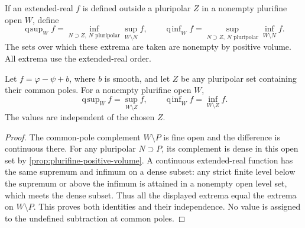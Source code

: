 \begin{definition}\label{def:pluripolar-quasi-extrema}
If an extended-real $f$ is defined outside a pluripolar $Z$ in a nonempty plurifine open $W$, define
\[
 \operatorname{q\!\sup}_W f
   =\inf_{N\supset Z,\ N\text{ pluripolar}}\sup_{W\setminus N}f,
 \qquad
 \operatorname{q\!\inf}_W f
   =\sup_{N\supset Z,\ N\text{ pluripolar}}\inf_{W\setminus N}f.
\]
The sets over which these extrema are taken are nonempty by positive volume. All extrema use the extended-real order.
\end{definition}

\begin{corollary}\label{cor:quasi-extrema-common-poles}
Let $f=\varphi-\psi+b$, where $b$ is smooth, and let $Z$ be any pluripolar set containing their common poles. For a nonempty plurifine open $W$,
\[
 \operatorname{q\!\sup}_W f=\sup_{W\setminus Z}f,
 \qquad
 \operatorname{q\!\inf}_W f=\inf_{W\setminus Z}f.
\]
The values are independent of the chosen $Z$.
\end{corollary}
\begin{proof}
The common-pole complement $W\setminus P$ is fine open and the difference is continuous there. For any pluripolar $N\supset P$, its complement is dense in this open set by \cref{prop:plurifine-positive-volume}. A continuous extended-real function has the same supremum and infimum on a dense subset: any strict finite level below the supremum or above the infimum is attained in a nonempty open level set, which meets the dense subset. Thus all the displayed extrema equal the extrema on $W\setminus P$. This proves both identities and their independence. No value is assigned to the undefined subtraction at common poles.
\end{proof}
